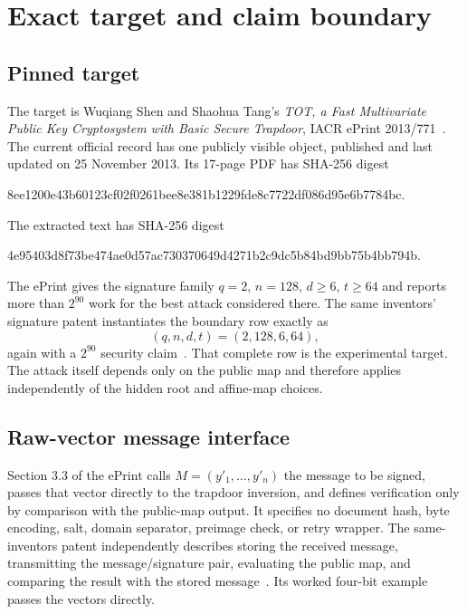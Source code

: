 \documentclass[10pt,a4paper]{article}
\begin{document}
\section{Exact target and claim boundary}

\subsection{Pinned target}

The target is Wuqiang Shen and Shaohua Tang's \emph{TOT, a Fast
Multivariate Public Key Cryptosystem with Basic Secure Trapdoor}, IACR ePrint
2013/771~\cite{tot}.  The current official record has one publicly visible
object, published and last updated on 25 November 2013.  Its 17-page PDF has
SHA-256 digest
\begin{center}
\small\ttfamily
8ee1200e43b60123cf02f0261bee8e381b1229fde8c7722df086d95e6b7784bc.
\end{center}
The extracted text has SHA-256 digest
\begin{center}
\small\ttfamily
4e95403d8f73be474ae0d57ac730370649d4271b2c9dc5b84bd9bb75b4bb794b.
\end{center}

The ePrint gives the signature family $q=2$, $n=128$, $d\geq6$,
$t\geq64$ and reports more than $2^{90}$ work for the best attack considered
there.  The same inventors' signature patent instantiates the boundary row
exactly as
\[
  (q,n,d,t)=(2,128,6,64),
\]
again with a $2^{90}$ security claim~\cite{patent}.  That complete row is the
experimental target.  The attack itself depends only on the public map and
therefore applies independently of the hidden root and affine-map choices.

\subsection{Raw-vector message interface}

Section 3.3 of the ePrint calls
$M=(y'_1,\ldots,y'_n)$ the message to be signed, passes that vector directly
to the trapdoor inversion, and defines verification only by comparison with
the public-map output.  It specifies no document hash, byte encoding, salt,
domain separator, preimage check, or retry wrapper.  The same-inventors
patent independently describes storing the received message, transmitting
the message/signature pair, evaluating the public map, and comparing the
result with the stored message~\cite{patent}.  Its worked four-bit example
passes the vectors directly.
\end{document}
